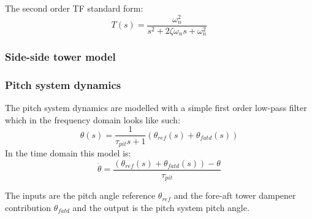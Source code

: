 The second order TF standard form:
\begin{equation}\label{eq:std_tf}
	T(s) = \dfrac{\omega_n^2}{s^2 + 2 \zeta \omega_n s + \omega_n^2}
\end{equation}

\subsubsection{Side-side tower model}



\subsubsection{Pitch system dynamics} \label{sec:mod_wtLin_pitch}
The pitch system dynamics are modelled with a simple first order low-pass filter which in the frequency domain looks like such:
\begin{equation}\label{eq:wtLin_pitch_freq}
	\theta(s) = \dfrac{1}{\tau_{pit} s + 1} (\theta_{ref}(s) + \theta_{fatd}(s))
\end{equation}
In the time domain this model is:
\begin{equation}\label{eq:wtLin_pitch_time}
	\dot{\theta} =\dfrac{(\theta_{ref}(s) + \theta_{fatd}(s)) - \theta}{\tau_{pit}}
\end{equation}



The inputs are the pitch angle reference $ \theta_{ref} $ and the fore-aft tower dampener contribution $ \theta_{fatd} $ and the output is the pitch system pitch angle.


